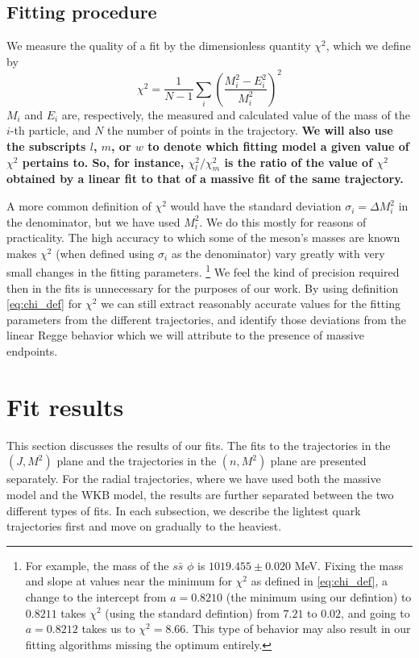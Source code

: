\documentclass[11pt,a4]{article}
\def\be{\begin{equation}}
\def\ee{\end{equation}}
\newcommand{\ssb}{s\bar{s}}
\begin{document}
\subsection{Fitting procedure}
		We measure the quality of a fit by the dimensionless quantity \(\chi^2\), which we define by
				\be \chi^2 = \frac{1}{N-1}\sum_i\left(\frac{M_i^2-E_i^2}{M_i^2}\right)^2 \label{eq:chi_def} \ee
			\(M_i\) and \(E_i\) are, respectively, the measured and calculated value of the mass of the \(i\)-th particle, and \(N\) the number of points in the trajectory. \textbf{We will also use the subscripts \(l\), \(m\), or \(w\) to denote which fitting model a given value of \(\chi^2\) pertains to. So, for instance, \(\chi^2_l/\chi^2_m\) is the ratio of the value of \(\chi^2\) obtained by a linear fit to that of a massive fit of the same trajectory.}

			A more common definition of \(\chi^2\) would have the standard deviation \(\sigma_i = \Delta M_i^2\) in the denominator, but we have used \(M_i^2\). We do this mostly for reasons of practicality. The high accuracy to which some of the meson's masses are known makes \(\chi^2\) (when defined using \(\sigma_i\) as the denominator) vary greatly with very small changes in the fitting parameters. \footnote{For example, the mass of the \(\ssb\) \(\phi\) is \(1019.455\pm0.020\) MeV. Fixing the mass and slope at values near the minimum for \(\chi^2\) as defined in \eqref{eq:chi_def}, a change to the intercept from \(a = 0.8210\) (the minimum using our defintion) to \(0.8211\) takes \(\chi^2\) (using the standard defintion) from \(7.21\) to \(0.02\), and going to \(a = 0.8212\) takes us to \(\chi^2 = 8.66\). This type of behavior may also result in our fitting algorithms missing the optimum entirely.} We feel the kind of precision required then in the fits is unnecessary for the purposes of our work. By using definition \eqref{eq:chi_def} for \(\chi^2\) we can still extract reasonably accurate values for the fitting parameters from the different trajectories, and identify those deviations from the linear Regge behavior which we will attribute to the presence of massive endpoints.

\section{Fit results}

This section discusses the results of our fits. The fits to the trajectories in the \((J,M^2)\) plane and the trajectories in the \((n,M^2)\) plane are presented separately. For the radial trajectories, where we have used both the massive model and the WKB model, the results are further separated between the two different types of fits. In each subsection, we describe the lightest quark trajectories first and move on gradually to the heaviest.
\end{document}
